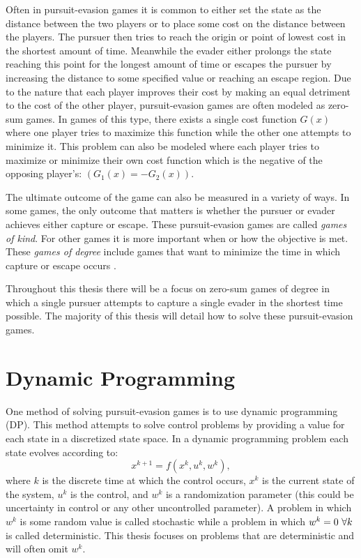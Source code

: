 Often in pursuit-evasion games it is common to either set the state as the distance between the two players or to place some cost on the distance between the players. The pursuer then tries to reach the origin or point of lowest cost in the shortest amount of time. Meanwhile the evader either prolongs the state reaching this point for the longest amount of time or escapes the pursuer by increasing the distance to some specified value or reaching an escape region. Due to the nature that each player improves their cost by making an equal detriment to the cost of the other player, pursuit-evasion games are often modeled as zero-sum games. In games of this type, there exists a single cost function $G(x)$ where one player tries to maximize this function while the other one attempts to minimize it. This problem can also be modeled where each player tries to maximize or minimize their own cost function which is the negative of the opposing player's: $(G_1(x) = -G_2(x))$.

The ultimate outcome of the game can also be measured in a variety of ways. In some games, the only outcome that matters is whether the pursuer or evader achieves either capture or escape. These pursuit-evasion games are called \textit{games of kind}. For other games it is more important when or how the objective is met. These \textit{games of degree} include games that want to minimize the time in which capture or escape occurs \cite{isaacs}.

Throughout this thesis there will be a focus on zero-sum games of degree in which a single pursuer attempts to capture a single evader in the shortest time possible. The majority of this thesis will detail how to solve these pursuit-evasion games.

\section{Dynamic Programming}

One method of solving pursuit-evasion games is to use dynamic programming (DP). This method attempts to solve control problems by providing a value for each state in a discretized state space. In a dynamic programming problem each state evolves according to:
\begin{equation}
x^{k+1}=f(x^k,u^k,w^k),
\end{equation} 
where $k$ is the discrete time at which the control occurs, $x^k$ is the current state of the system, $u^k$ is the control, and $w^k$ is a randomization parameter (this could be uncertainty in control or any other uncontrolled parameter). A problem in which $w^k$ is some random value is called stochastic while a problem in which $w^k = 0 \textnormal{ } \forall k$ is called deterministic. This thesis focuses on problems that are deterministic and will often omit $w^k$.

